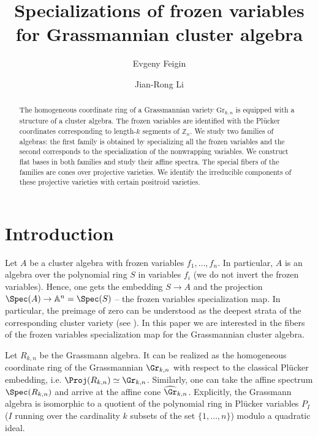 \documentclass[11pt]{amsart}
\numberwithin{equation}{section}
\newcommand{\bA}{{\mathbb A}}
\begin{document}
\title[Specializations of frozen variables]
{Specializations of frozen variables for Grassmannian cluster algebra}


\author{Evgeny Feigin}
\address{Evgeny Feigin:\newline
School of Mathematical Sciences, Tel Aviv University, Tel Aviv, 69978, Israel}

\author{Jian-Rong Li}
\address{Jian-Rong Li:\newline 
Faculty of Mathematics, University of Seville, Calle Tarfia s/n, 41012 Seville, Spain}

\begin{abstract}
The homogeneous coordinate ring of a Grassmannian variety $\mathrm{Gr}_{k,n}$ is equipped with a
structure of a cluster
algebra. The frozen variables are identified with the Pl\"ucker coordinates corresponding
to length-$k$ segments of ${\mathbb Z}_n$. We study two families of algebras: the first family
is obtained by specializing all the frozen variables and the second corresponds to the 
specialization of the nonwrapping variables. We construct flat bases in both families and
study their affine spectra. The special fibers of the families are cones over projective varieties. 
We identify the irreducible components of these projective varieties with certain positroid varieties.
\end{abstract}


\maketitle

\section{Introduction}


Let $A$ be a cluster algebra with frozen variables $f_1,\dots,f_n$. In particular, 
$A$ is an algebra over the polynomial ring $S$ in variables $f_i$ (we do not invert
the frozen variables). Hence, one gets the embedding $S\to A$ and the projection
$\Spec(A)\to \bA^n=\Spec(S)$ -- the frozen variables specialization map. 
In particular, the preimage of zero can be understood as the deepest strata of the
corresponding cluster variety (see \cite{BF19,CMNC22,GHKK18}).
In this paper we are interested in the fibers of the frozen variables specialization
map for the Grassmannian cluster algebra. 

Let $R_{k,n}$ be the Grassmann algebra. It can be realized as the homogeneous
coordinate ring of the Grassmannian $\Gr_{k,n}$ with respect to the classical 
Pl\"ucker embedding, i.e. $\Proj(R_{k,n})\simeq \Gr_{k,n}$. Similarly, one 
can take the affine spectrum $\Spec(R_{k,n})$ and arrive at the affine cone 
$\widehat\Gr_{k,n}$. Explicitly, the Grassmann algebra is
isomorphic to a quotient of the polynomial ring in Pl\"ucker variables 
$P_I$ ($I$ running over the cardinality $k$ subsets of the set $\{1,\dots,n\}$) modulo
a quadratic ideal. 
\end{document}
